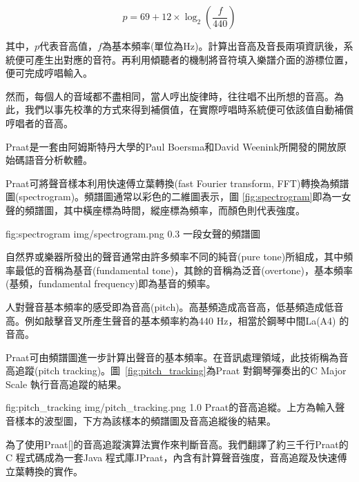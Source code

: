 \documentclass[12pt,a4paper,oneside]{report}
\begin{document}
\[
p=69+12\times\log_2{\left(\frac{f}{440}\right)}
\]

其中，\(p\)代表音高值，\(f\)為基本頻率(單位為Hz)。計算出音高及音長兩項資訊後，系統便可產生出對應的音符。再利用傾聽者的機制將音符填入樂譜介面的游標位置，便可完成哼唱輸入。

然而，每個人的音域都不盡相同，當人哼出旋律時，往往唱不出所想的音高。為此，我們以事先校準的方式來得到補償值，在實際哼唱時系統便可依該值自動補償哼唱者的音高。


Praat是一套由阿姆斯特丹大學的Paul Boersma和David Weenink所開發的開放原始碼語音分析軟體。

Praat可將聲音樣本利用快速傅立葉轉換(fast Fourier transform, FFT)轉換為頻譜圖(spectrogram)。頻譜圖通常以彩色的二維圖表示，圖 \ref{fig:spectrogram}即為一女聲的頻譜圖，其中橫座標為時間，縱座標為頻率，而顏色則代表強度。

\figurewithcaption
{fig:spectrogram}
{img/spectrogram.png}
{0.3}
{一段女聲的頻譜圖}

自然界或樂器所發出的聲音通常由許多頻率不同的純音(pure tone)所組成，其中頻率最低的音稱為基音(fundamental tone)，其餘的音稱為泛音(overtone)，基本頻率(基頻，fundamental frequency)即為基音的頻率。

人對聲音基本頻率的感受即為音高(pitch)。高基頻造成高音高，低基頻造成低音高。例如敲擊音叉所產生聲音的基本頻率約為440 Hz，相當於鋼琴中間La(A4) 的音高。

Praat可由頻譜圖進一步計算出聲音的基本頻率。在音訊處理領域，此技術稱為音高追蹤(pitch tracking)。圖~\ref{fig:pitch_tracking}為Praat 對鋼琴彈奏出的C Major Scale 執行音高追蹤的結果。


\figurewithcaption
{fig:pitch_tracking}
{img/pitch_tracking.png}
{1.0}
{Praat的音高追縱。上方為輸入聲音樣本的波型圖，下方為該樣本的頻譜圖及音高追縱後的結果。}

為了使用Praat[]的音高追蹤演算法實作來判斷音高。我們翻譯了約三千行Praat的C 程式碼成為一套Java 程式庫JPraat，內含有計算聲音強度，音高追蹤及快速傅立葉轉換的實作。


\end{document}

